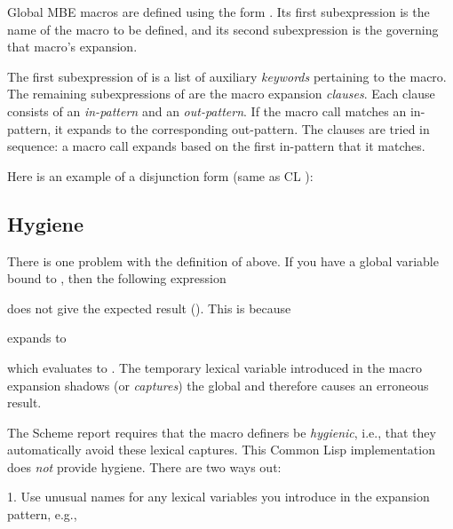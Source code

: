 Global MBE macros are defined using the form
.  Its first subexpression is the name of the
macro to be defined, and its second subexpression is the
 governing that macro's expansion.

The first subexpression of  is a list of
auxiliary {\it keywords\/} pertaining to the macro.  The
remaining subexpressions of  are the macro
expansion {\it clauses}.  Each clause consists of an {\it
in-pattern\/} and an {\it out-pattern}.  If the macro call
matches an in-pattern, it expands to the corresponding
out-pattern.  The clauses are tried in sequence: a macro
call expands based on the first in-pattern that it matches.

Here is an example of a disjunction form  (same as
CL ):


\subsection{Hygiene}

There is one problem with the definition of  above.
If you have a global variable  bound to ,
then the following expression


does not give the expected result ().  This is because


expands to


which evaluates to .  The temporary lexical variable
 introduced in the macro expansion shadows (or {\it
captures\/}) the
global  and therefore causes an erroneous result.

The Scheme report requires that the macro definers be {\it
hygienic}, i.e., that they automatically avoid these lexical
captures.  This Common Lisp implementation does {\it not\/}
provide hygiene.  There are two ways out:

1. Use unusual names for any lexical variables you introduce
in the expansion pattern, e.g.,


